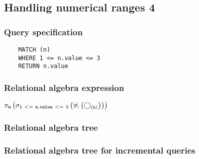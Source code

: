 	\subsection{Handling numerical ranges 4}

	\subsubsection*{Query specification}

	\begin{lstlisting}
	MATCH (n)
	WHERE 1 <= n.value <= 3
	RETURN n.value
	\end{lstlisting}


	\subsubsection*{Relational algebra expression}

	$\projection{\var{n}} \left(\selection{\mathtt{1~<=~n.value~<=~3}} \left(\alldifferent{} \left(\getvertices{n}{}\right)\right)\right)$

	\subsubsection*{Relational algebra tree}


	\subsubsection*{Relational algebra tree for incremental queries}

